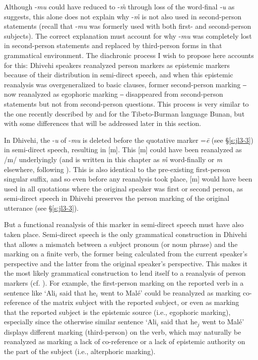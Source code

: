 \documentclass[output=paper]{langsci/langscibook}
\begin{document}
Although ‑\textit{mu} could have reduced to -\textit{m}̊ through loss of the word-final ‑\textit{u} as \cite[169]{Fritz2002} suggests, this alone does not explain why -\textit{m̊} is not also used in second-person statements (recall that -\textit{mu} was formerly used with both first- and second-person subjects). The correct explanation must account for why -\textit{mu} was completely lost in second-person statements and replaced by third-person forms in that grammatical environment. The diachronic process I wish to propose here accounts for this: Dhivehi speakers reanalyzed person markers as epistemic markers because of their distribution in semi-direct speech, and when this epistemic reanalysis was overgeneralized to basic clauses, former second-person marking ‒ now reanalyzed as egophoric marking ‒ disappeared from second-person statements but not from second-person questions. This process is very similar to the one recently described by \cite{Widmer2015} and \cite{WidmerZemp2017} for the Tibeto-Burman language Bunan, but with some differences that will be addressed later in this section. 

In Dhivehi, the -\textit{u} of -\textit{mu} is deleted before the quotative marker =\textit{ē} (see §\ref{s:jl3-3}) in semi-direct speech, resulting in [m]. This [m] could have been reanalyzed as /m/ underlyingly (and is written in this chapter as \textit{m̊ } word-finally or \textit{m} elsewhere, following \citealt{Gnanadesikan2017}). This is also identical to the pre-existing first-person singular suffix, and so even before any reanalysis took place, [m] would have been used in all quotations where the original speaker was first or second person, as semi-direct speech in Dhivehi preserves the person marking of the original utterance (see §\ref{s:jl3-3}). 

But a functional reanalysis of this marker in semi-direct speech must have also taken place. Semi-direct speech is the only grammatical construction in Dhivehi that allows a mismatch between a subject pronoun (or noun phrase) and the marking on a finite verb, the former being calculated from the current speaker’s perspective and the latter from the original speaker’s perspective. This makes it the most likely grammatical construction to lend itself to a reanalysis of person markers (cf. \citealt[54–56]{WidmerZemp2017}). For example, the first-person marking on the reported verb in a sentence like ‘Ali$_i$ said that he$_i$ went to Malé’ could be reanalyzed as marking co-reference of the matrix subject with the reported subject, or even as marking that the reported subject is the epistemic source (i.e., egophoric marking), especially since the otherwise similar sentence ‘Ali$_i$ said that he$_j$ went to Malé’ displays different marking (third-person) on the verb, which may naturally be reanalyzed as marking a lack of co-reference or a lack of epistemic authority on the part of the subject (i.e., alterphoric marking). 
\end{document}
